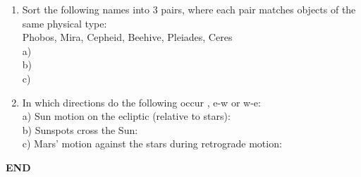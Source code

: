 \documentclass[11pt]{article}
\begin{document}
\begin{enumerate}
\vspace{0.5cm}
\item
Sort the following names into 3 pairs, where each pair matches objects
of the same physical type: \\
Phobos, Mira, Cepheid, Beehive, Pleiades, Ceres \\
a) \makebox[5cm]{\hrulefill} \\
b) \makebox[5cm]{\hrulefill} \\
c) \makebox[5cm]{\hrulefill} 

\vspace{0.5cm}
\item
In which directions do the following occur , e-w or w-e: \\
a) Sun motion on the ecliptic (relative to stars):  \makebox[3cm]{\hrulefill} \\
b) Sunspots cross the Sun:  \makebox[3cm]{\hrulefill} \\
c) Mars' motion against the stars during retrograde motion:
\makebox[3cm]{\hrulefill} 



\end{enumerate}

\bigskip
{\bf END}
\end{document}
